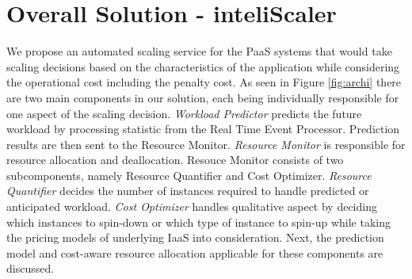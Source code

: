 \section{Overall Solution - inteliScaler}
We propose an automated scaling service for the PaaS systems that would take scaling decisions based on the characteristics of the application while considering the operational cost including the penalty cost. As seen in Figure \ref{fig:archi} there are two main components in our solution, each being individually responsible for one aspect of the scaling decision. \textit{Workload Predictor} predicts the future workload by processing statistic from the Real Time Event Processor. Prediction results are then sent to the Resource Monitor. \textit{Resource Monitor} is responsible for resource allocation and deallocation. Resouce Monitor consists of two subcomponents, namely Resource Quantifier and Cost Optimizer. \textit{Resource Quantifier} decides the number of instances required to handle predicted or anticipated workload. \textit{Cost Optimizer} handles qualitative aspect by deciding which instances to spin-down or which type of instance to spin-up while taking the pricing models of underlying IaaS into consideration. Next, the prediction model and cost-aware resource allocation applicable for these components are discussed.